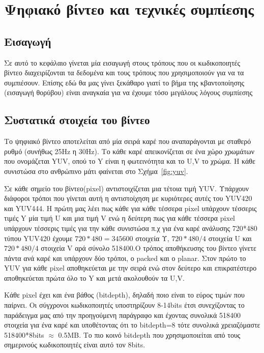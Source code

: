 ﻿\chapter{Ψηφιακό βίντεο και τεχνικές συμπίεσης}
\label{chapter:chap2}


\section{Εισαγωγή}
\label{section:sect21}
\indent
Σε αυτό το κεφάλαιο γίνεται μία εισαγωγή στους τρόπους που οι κωδικοποιητές βίντεο διαχειρίζονται τα δεδομένα και τους τρόπους που χρησιμοποιούν για να τα συμπιέσουν. Επίσης εδώ θα μας γίνει ξεκάθαρο γιατί το βήμα της κβαντοποίησης (εισαγωγή θορύβου) είναι αναγκαία για να έχουμε τόσο μεγάλους λόγους συμπίεσης

\section{Συστατικά στοιχεία του βίντεο}
\label{section:sect22}

\indent Το ψηφιακό βίντεο αποτελείται από μία σειρά καρέ που αναπαράγονται με σταθερό ρυθμό (συνήθως 25Hz η 30Hz). Το κάθε καρέ απεικονίζεται σε ένα χώρο χρωμάτων που ονομάζεται YUV, οπού το Y είναι η φωτεινότητα και το U,V το χρώμα. Η κάθε συνιστώσα στο ανθρώπινο μάτι φαίνεται στο Σχήμα~\ref{fig:yuv}.

\indent Σε κάθε σημείο του βίντεο(pixel) αντιστοιχίζεται μια τέτοια τιμή YUV. Υπάρχουν διάφοροι τρόποι που γίνεται αυτή η αντιστοίχηση με κυριότερες αυτές του YUV420 και YUV444. Η πρώτη μας λέει πως κάθε για κάθε τέσσερα pixel υπάρχουν τέσσερις τιμές Y μία τιμή U και μια τιμή V ενώ η δεύτερη πως για κάθε τέσσερα pixel υπάρχουν τέσσερις τιμές για την κάθε συνιστώσα π.χ για ένα καρέ ανάλυσης 720*480 τύπου YUV420 έχουμε \(720*480=345600\) στοιχεία Υ, \(720*480/4\) στοιχεία U και \(720*480/4 \) στοιχεία V αρά σύνολο 518400.Ο τρόπος αποθήκευσης του βίντεο γίνετε πάντα ανά καρέ και υπάρχουν δύο τρόποι, ο packed και ο planar. Στον πρώτο το YUV για κάθε pixel αποθηκεύεται με την σειρά ενώ στον δεύτερο και επικρατέστερο αποθηκεύεται πρώτα όλο το Y και μετά ακολουθούν τα U,V.

\indent Κάθε pixel έχει και ένα βάθος (bitdepth), δηλαδή ποιο είναι το εύρος τιμών που παίρνει. Οι σύγχρονοι κωδικοποιητές υποστηρίζουν 8-14bits έτσι συνεχίζοντας το παράδειγμα μας από την προηγούμενη παράγραφο και έχοντας συνολικά 518400 στοιχεία για ένα καρέ και υποθέτοντας ότι το bitdepth=8 τότε συνολικά χρειαζόμαστε 518400*8bits $\approx$ 0.5MB. Το πιο κοινό bitdepth που χρησιμοποιείται από τους σημερινούς κωδικοποιητές είναι αυτό τον 8bits.

